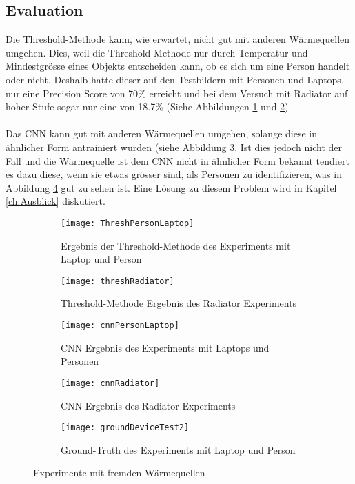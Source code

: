 \subsection{Evaluation}

Die Threshold-Methode kann, wie erwartet, nicht gut mit anderen Wärmequellen umgehen. Dies, weil die Threshold-Methode nur durch Temperatur und Mindestgrösse eines Objekts entscheiden kann, ob es sich um eine Person handelt oder nicht. Deshalb hatte dieser auf den Testbildern mit Personen und Laptops, nur eine Precision Score von 70\% erreicht und bei dem Versuch mit Radiator auf hoher Stufe sogar nur eine von 18.7\% (Siehe Abbildungen  \ref{fig:ThreshPersonLaptop} und \ref{fig:thresholdRadiator}).\\
\\
Das \gls{CNN} kann gut mit anderen Wärmequellen umgehen, solange diese in ähnlicher Form antrainiert wurden (siehe Abbildung \ref{fig:cnnPersonLaptop}. Ist dies jedoch nicht der Fall und die Wärmequelle ist dem \gls{CNN} nicht in ähnlicher Form bekannt tendiert es dazu diese, wenn sie etwas grösser sind, als Personen zu identifizieren, was in Abbildung \ref{fig:cnnRadiator} gut zu sehen ist. Eine Lösung zu diesem Problem wird in Kapitel \ref{ch:Ausblick} diskutiert. 

\vspace{.5em}
\begin{figure}[htb]
	\centering
	\begin{subfigure}{.45\linewidth}
		\centering
		\texttt{[image: ThreshPersonLaptop]}
		\caption{Ergebnis der Threshold-Methode des Experiments mit Laptop und Person}
		\label{fig:ThreshPersonLaptop}
	\end{subfigure}\hfill%
	\begin{subfigure}{.45\linewidth}
		\centering
		\texttt{[image: threshRadiator]}
		\caption{Threshold-Methode Ergebnis des Radiator Experiments}
		\label{fig:thresholdRadiator}
	\end{subfigure}\hfill%
	\begin{subfigure}{.45\linewidth}
		\centering
		\texttt{[image: cnnPersonLaptop]}
		\caption{CNN Ergebnis des Experiments mit Laptops und Personen}
		\label{fig:cnnPersonLaptop}
	\end{subfigure}\hfill%
	\begin{subfigure}{.45\linewidth}
		\centering
		\texttt{[image: cnnRadiator]}
		\caption{CNN Ergebnis des Radiator Experiments}
		\label{fig:cnnRadiator}
	\end{subfigure}\hfill%
	\begin{subfigure}{.55\linewidth}
		\centering
		\texttt{[image: groundDeviceTest2]}
		\caption{Ground-Truth des Experiments mit Laptop und Person}
		\label{fig:groundPersonLaptop}
	\end{subfigure}
	\caption{Experimente mit fremden Wärmequellen}
	\label{fig:HeatSources}
\end{figure}
\vspace{.5em}



